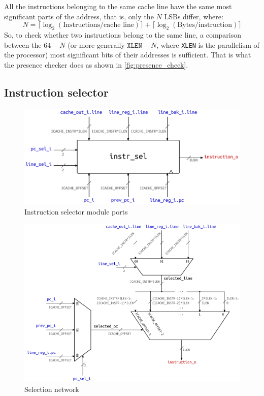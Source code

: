 All the instructions belonging to the same cache line have the same most significant parts of the address, that is, only the $N$ LSBs differ, where:
\begin{equation*}
  N = \lceil \log_2(\text{Instructions/cache line}) \rceil + 
      \lceil \log_2(\text{Bytes/instruction}) \rceil
\end{equation*}
So, to check whether two instructions belong to the same line, a comparison between the $64-N$ (or more generally $\texttt{XLEN}-N$, where \texttt{XLEN} is the parallelism of the processor) most significant bits of their addresses is sufficient. That is what the presence checker does as shown in \cref{fig:presence_check}.

\subsection{Instruction selector}\label{sec:instrsel}
\begin{figure}[hbt]
  \centering
  \includegraphics{img/instr_sel-top.pdf}
  \caption{Instruction selector module ports}
  \label{fig:instr_sel-top}
\end{figure}
\begin{figure}[hbt]
  \includegraphics[width=\textwidth]{img/instr_sel.pdf}
  \caption{Selection network}
  \label{fig:instr_sel}
\end{figure}
